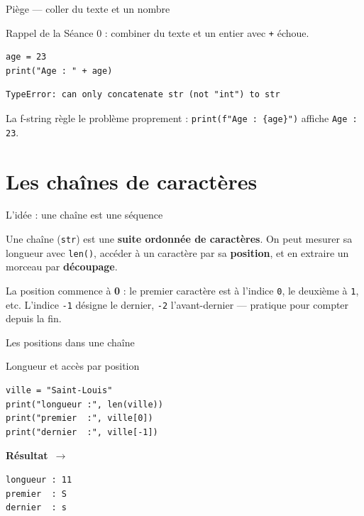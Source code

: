 \documentclass[aspectratio=169,11pt]{beamer}
\newcommand{\resultat}{{\scriptsize\textbf{R\'esultat}~$\rightarrow$}\par\vspace{1pt}}
\begin{document}
\begin{frame}[fragile]{Piège — coller du texte et un nombre}
\begin{ucadpiege}
{\small Rappel de la Séance 0 : combiner du texte et un entier avec \texttt{+} échoue.}
\end{ucadpiege}
\begin{lstlisting}
age = 23
print("Age : " + age)
\end{lstlisting}
\begin{lstlisting}[style=err]
TypeError: can only concatenate str (not "int") to str
\end{lstlisting}
{\small La f-string règle le problème proprement : \texttt{print(f"Age : \{age\}")} affiche \texttt{Age : 23}.}
\end{frame}

\section{Les chaînes de caractères}

\begin{frame}{L'idée : une chaîne est une séquence}
\begin{ucaddef}
{\small Une chaîne (\texttt{str}) est une \textbf{suite ordonnée de caractères}. On peut mesurer sa longueur avec \texttt{len()}, accéder à un caractère par sa \textbf{position}, et en extraire un morceau par \textbf{découpage}.}
\end{ucaddef}
{\small La position commence à \textbf{0} : le premier caractère est à l'indice \texttt{0}, le deuxième à \texttt{1}, etc. L'indice \texttt{-1} désigne le dernier, \texttt{-2} l'avant-dernier — pratique pour compter depuis la fin.}
\end{frame}

\begin{frame}{Les positions dans une chaîne}
\end{frame}

\begin{frame}[fragile]{Longueur et accès par position}
\begin{lstlisting}
ville = "Saint-Louis"
print("longueur :", len(ville))
print("premier  :", ville[0])
print("dernier  :", ville[-1])
\end{lstlisting}
\resultat
\begin{lstlisting}[style=out]
longueur : 11
premier  : S
dernier  : s
\end{lstlisting}
\end{frame}
\end{document}
